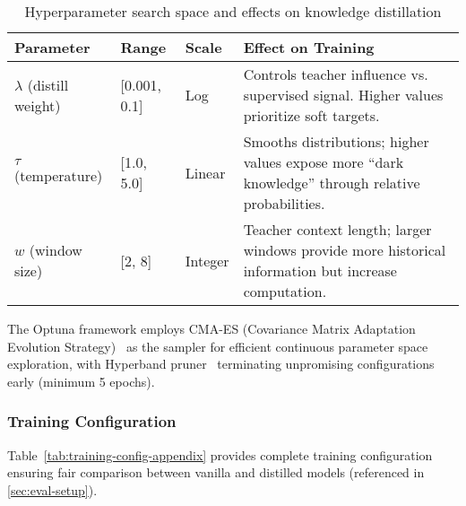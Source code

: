 \begin{table}[H]
\centering
\caption{Hyperparameter search space and effects on knowledge distillation}
\label{tab:hyperparam-search-appendix}
\begin{tabular}{lll p{5.5cm}}
\toprule
\textbf{Parameter} & \textbf{Range} & \textbf{Scale} & \textbf{Effect on Training} \\
\midrule
$\lambda$ (distill weight) & [0.001, 0.1] & Log & Controls teacher influence vs. supervised signal. Higher values prioritize soft targets. \\
\addlinespace
$\tau$ (temperature) & [1.0, 5.0] & Linear & Smooths distributions; higher values expose more ``dark knowledge'' through relative probabilities. \\
\addlinespace
$w$ (window size) & [2, 8] & Integer & Teacher context length; larger windows provide more historical information but increase computation. \\
\bottomrule
\end{tabular}
\end{table}

The Optuna framework employs CMA-ES (Covariance Matrix Adaptation Evolution Strategy)~\cite{hansenCMAEvolutionStrategy2023} as the sampler for efficient continuous parameter space exploration, with Hyperband pruner~\cite{liHyperbandNovelBanditBased2018} terminating unpromising configurations early (minimum 5 epochs).

\subsubsection{Training Configuration}
\label{app:training-config}

Table~\ref{tab:training-config-appendix} provides complete training configuration ensuring fair comparison between vanilla and distilled models (referenced in \autoref{sec:eval-setup}).

